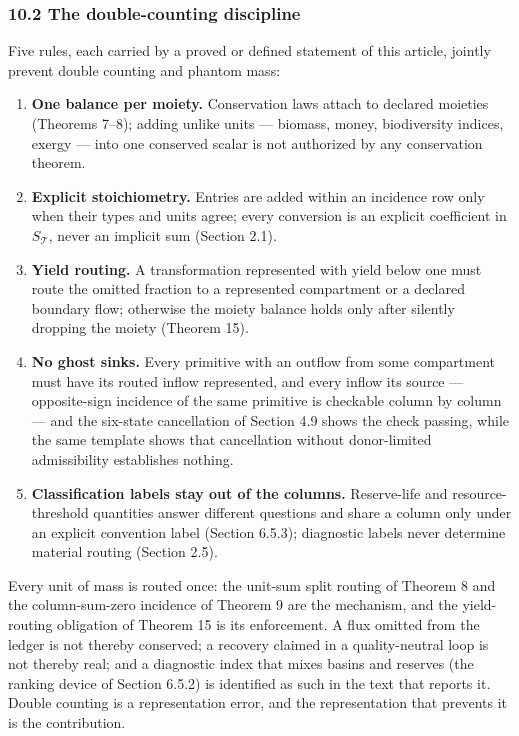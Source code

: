 \documentclass[11pt]{article}
\providecommand{\tightlist}{\setlength{\itemsep}{0pt}\setlength{\parskip}{0pt}}
\begin{document}
\subsubsection{10.2 The double-counting
discipline}\label{the-double-counting-discipline}

Five rules, each carried by a proved or defined statement of this
article, jointly prevent double counting and phantom mass:

\begin{enumerate}
\def\labelenumi{\arabic{enumi}.}
\tightlist
\item
  \textbf{One balance per moiety.} Conservation laws attach to declared
  moieties (Theorems 7--8); adding unlike units --- biomass, money,
  biodiversity indices, exergy --- into one conserved scalar is not
  authorized by any conservation theorem.
\item
  \textbf{Explicit stoichiometry.} Entries are added within an incidence
  row only when their types and units agree; every conversion is an
  explicit coefficient in \(S_{\mathcal{T}}\), never an implicit sum
  (Section 2.1).
\item
  \textbf{Yield routing.} A transformation represented with yield below
  one must route the omitted fraction to a represented compartment or a
  declared boundary flow; otherwise the moiety balance holds only after
  silently dropping the moiety (Theorem 15).
\item
  \textbf{No ghost sinks.} Every primitive with an outflow from some
  compartment must have its routed inflow represented, and every inflow
  its source --- opposite-sign incidence of the same primitive is
  checkable column by column --- and the six-state cancellation of
  Section 4.9 shows the check passing, while the same template shows
  that cancellation without donor-limited admissibility establishes
  nothing.
\item
  \textbf{Classification labels stay out of the columns.} Reserve-life
  and resource-threshold quantities answer different questions and share
  a column only under an explicit convention label (Section 6.5.3);
  diagnostic labels never determine material routing (Section 2.5).
\end{enumerate}

Every unit of mass is routed once: the unit-sum split routing of Theorem
8 and the column-sum-zero incidence of Theorem 9 are the mechanism, and
the yield-routing obligation of Theorem 15 is its enforcement. A flux
omitted from the ledger is not thereby conserved; a recovery claimed in
a quality-neutral loop is not thereby real; and a diagnostic index that
mixes basins and reserves (the ranking device of Section 6.5.2) is
identified as such in the text that reports it. Double counting is a
representation error, and the representation that prevents it is the
contribution.
\end{document}
